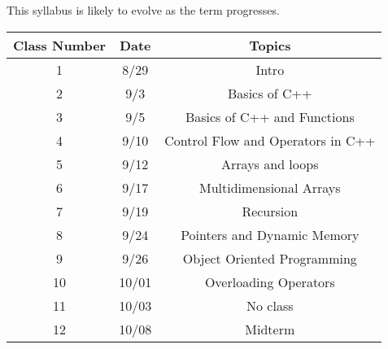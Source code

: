 \documentclass[a4paper]{article}
\begin{document}
This syllabus is likely to evolve as the term progresses.
\begin{center}
    \begin{tabular}{||c c c ||} 
     \hline
     Class Number & Date & Topics  \\ [0.5ex] 
     \hline\hline
     1 & 8/29 & Intro  \\ 
     \hline
     2 & 9/3 & Basics of C++  \\
     \hline
     3 & 9/5 & Basics of C++ and Functions \\
     \hline
     4 & 9/10 & Control Flow and Operators in C++  \\
     \hline
     5 & 9/12 & Arrays and loops \\
     \hline
     6 & 9/17 & Multidimensional Arrays \\
     \hline
     7 & 9/19 & Recursion\\
     \hline
     8 & 9/24 &  Pointers and Dynamic Memory \\
     \hline
     9 & 9/26 & Object Oriented Programming  \\ 
     \hline
     10 & 10/01 & Overloading Operators \\
     \hline
     11 & 10/03 & No class \\
     \hline
     12 & 10/08 & Midterm \\ [1ex]
     \hline
    \end{tabular}
    \end{center}
\end{document}
